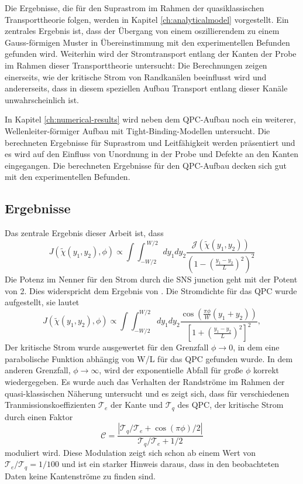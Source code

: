 Die Ergebnisse, die f\"ur den Suprastrom im Rahmen der quasiklassischen Transporttheorie folgen, werden in Kapitel  \ref{ch:analyticalmodel} vorgestellt. Ein zentrales Ergebnis ist, dass der \"Ubergang von einem oszillierendem zu einem Gauss-f\"ormigen Muster in \"Ubereinstimmung mit den experimentellen Befunden gefunden wird. Weiterhin wird der Stromtransport entlang der Kanten der Probe im Rahmen dieser Transporttheorie untersucht: Die Berechnungen zeigen einerseits, wie der kritische Strom von Randkan\"alen beeinflusst wird und andererseits, dass in diesem speziellen Aufbau Transport entlang dieser Kan\"ale unwahrscheinlich ist.

In Kapitel \ref{ch:numerical-results} wird neben dem QPC-Aufbau noch ein weiterer, Wellenleiter-f\"ormiger Aufbau mit Tight-Binding-Modellen untersucht. Die berechneten Ergebnisse f\"ur Suprastrom und Leitf\"ahigkeit werden pr\"asentiert und es wird auf den Einfluss von Unordnung in der Probe und Defekte an den Kanten eingegangen. Die berechneten Ergebnisse f\"ur den QPC-Aufbau decken sich gut mit den experimentellen Befunden.


\subsection*{Ergebnisse}
Das zentrale Ergebnis dieser Arbeit ist, dass
\begin{equation}
J(\tilde{\chi}(y_1, y_2), \phi) \propto \int \int_{-W/2}^{~W/2} dy_1 dy_2 \frac{ \mathcal{J}(\tilde{\chi}(y_1, y_2)) }{ \left( 1 - \left(\frac{y_1 - y_2}{L}\right)^2 \right)^2 }
\end{equation}
Die Potenz im Nenner f\"ur den Strom durch die SNS junction geht mit der Potent von 2. Dies widerspricht dem Ergebnis von \cite{Barzykin1999}. 
Die Stromdichte f\"ur das QPC wurde aufgestellt, sie lautet
\begin{equation}
J(\tilde{\chi}(y_1, y_2), \phi) \propto \int \int_{-W/2}^{W/2} d y_1 d y_2 \frac{\cos \left( \frac{\pi \phi}{W}(y_1 + y_2) \right)}{\left[ 1 + \left(\frac{y_1 - y_2}{L}\right)^2\right]^2} \label{eq:josephson_current},
\end{equation}
Der kritische Strom wurde ausgewertet f\"ur den Grenzfall $\phi \rightarrow 0$, in dem eine parabolische Funktion abh\"angig von W/L f\"ur das QPC gefunden wurde. In dem anderen Grenzfall, $\phi \rightarrow \infty$, wird der exponentielle Abfall f\"ur gro{\ss}e $\phi$ korrekt wiedergegeben. Es wurde auch das Verhalten der Randstr\"ome im Rahmen der quasi-klassischen N\"aherung untersucht und es zeigt sich, dass f\"ur verschiedenen Tranmissionskoeffizienten $\mathcal{T}_e$ der Kante und $\mathcal{T}_q$ des QPC, der kritische Strom durch einen Faktor 
\begin{equation}
\mathcal{C} =  \frac{| \mathcal{T}_q / \mathcal{T}_e + \cos \left( \pi \phi \right)/2 |}{\mathcal{T}_q / \mathcal{T}_e + 1/2}
\end{equation}
moduliert wird. Diese Modulation zeigt sich schon ab einem Wert von $\mathcal{T}_e/ \mathcal{T}_q = 1 / 100$ und ist ein starker Hinweis daraus, dass in den beobachteten Daten keine Kantenstr\"ome zu finden sind. 

